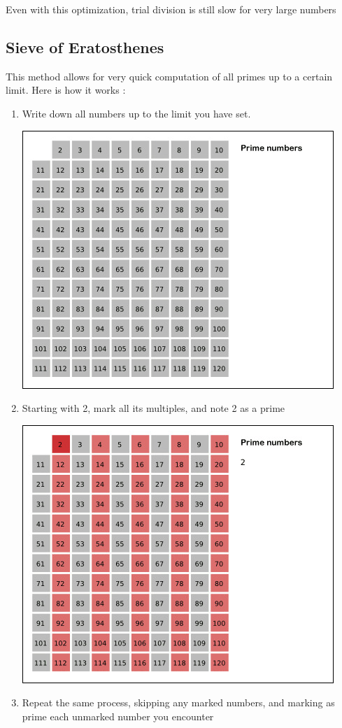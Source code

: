 \documentclass[12pt, titlepage]{article}
\begin{document}
    Even with this optimization, trial division is still slow for very large numbers 

    \subsection{Sieve of Eratosthenes}

    This method allows for very quick computation of all primes up to a certain limit. Here
    is how it works \autocite{wikipedia_eratosthenes_animation}:
    \begin{enumerate}
        \item Write down all numbers up to the limit you have set.

            \includegraphics[scale=0.6]{base}
        \item Starting with 2, mark all its multiples, and note 2 as a prime

            \includegraphics[scale=0.6]{2}\\
        \item Repeat the same process, skipping any marked numbers, and marking
            as prime each unmarked number you encounter


\end{enumerate}
\end{document}
